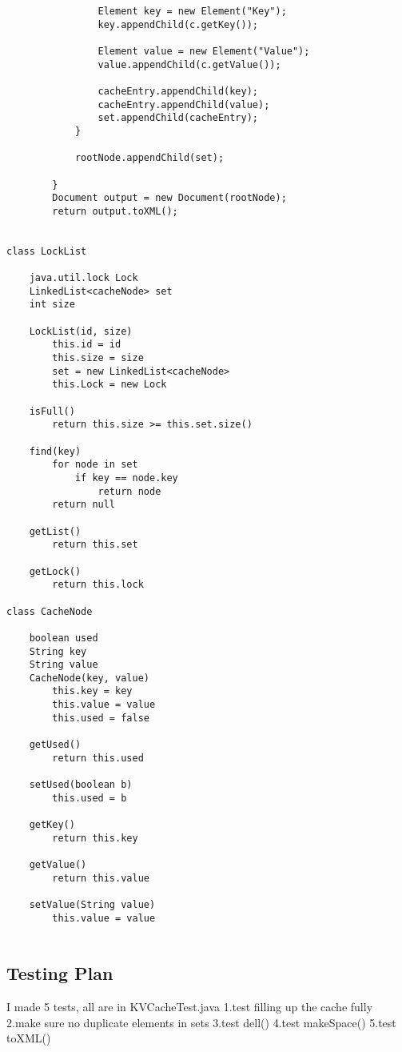 \begin{verbatim}
    			Element key = new Element("Key");
    			key.appendChild(c.getKey());
    			
    			Element value = new Element("Value");
    			value.appendChild(c.getValue());
    			
    			cacheEntry.appendChild(key);
    			cacheEntry.appendChild(value);
    			set.appendChild(cacheEntry);
    		}
    		
    		rootNode.appendChild(set);
    		
    	}
    	Document output = new Document(rootNode);
    	return output.toXML();
    	
    	
class LockList
   
    java.util.lock Lock
    LinkedList<cacheNode> set
    int size
   
    LockList(id, size)
        this.id = id
        this.size = size
        set = new LinkedList<cacheNode>
        this.Lock = new Lock
    
    isFull()
        return this.size >= this.set.size()
        
    find(key)
        for node in set
            if key == node.key
                return node
        return null
    
    getList()
        return this.set
    
    getLock()
        return this.lock
    
class CacheNode
    
    boolean used
    String key
    String value
    CacheNode(key, value)
        this.key = key
        this.value = value
        this.used = false
    
    getUsed()
        return this.used
    
    setUsed(boolean b)
        this.used = b
        
    getKey()
        return this.key
        
    getValue()
        return this.value
    
    setValue(String value)
        this.value = value
        
\end{verbatim}
\subsection{Testing Plan}
I made 5 tests, all are in KVCacheTest.java
    1.test filling up the cache fully
    2.make sure no duplicate elements in sets
    3.test dell()
    4.test makeSpace()
    5.test toXML()
